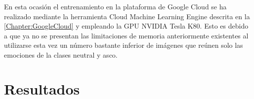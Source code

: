 En esta ocasión el entrenamiento en la plataforma de Google Cloud se ha realizado mediante la herramienta Cloud Machine Learning Engine descrita en la \autoref{Chapter:GoogleCloud} y empleando la GPU NVIDIA Tesla K80. Esto es debido a que ya no se presentan las limitaciones de memoria anteriormente existentes al utilizarse esta vez un número bastante inferior de imágenes que reúnen solo las emociones de la clases neutral y asco.

\section{Resultados}
